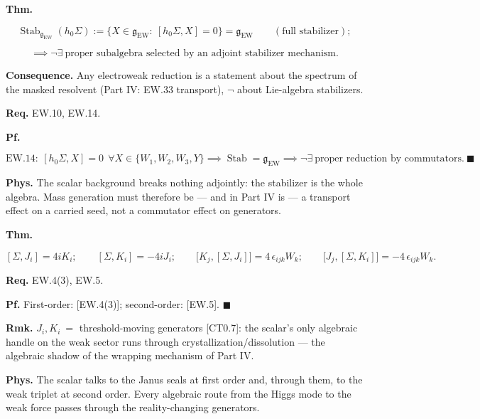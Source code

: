 \begin{theorem}\label{tag:EW-15}
\textbf{Thm.}

\[
\operatorname{Stab}_{\mathfrak g_{\mathrm{EW}}}(h_0\Sigma):=\{X\in\mathfrak g_{\mathrm{EW}}:\ [h_0\Sigma,X]=0\}=\mathfrak g_{\mathrm{EW}}\qquad(\text{full stabilizer});
\]

\[
\implies\neg\exists\ \text{proper subalgebra selected by an adjoint stabilizer mechanism}.
\]

\textbf{Consequence.} Any electroweak reduction is a statement about the spectrum of the masked resolvent (Part IV: EW.33 transport), $\neg$ about Lie-algebra stabilizers.

\textbf{Req.} EW.10, EW.14.

\textbf{Pf.}

\[
\mathrm{EW.14}:\ [h_0\Sigma,X]=0\ \ \forall X\in\{W_1,W_2,W_3,Y\}\implies\operatorname{Stab}=\mathfrak g_{\mathrm{EW}}\implies\neg\exists\ \text{proper reduction by commutators}.\ \blacksquare
\]

\textbf{Phys.} The scalar background breaks nothing adjointly: the stabilizer is the whole algebra. Mass generation must therefore be — and in Part IV is — a transport effect on a carried seed, not a commutator effect on generators.

\end{theorem}

\begin{theorem}\label{tag:EW-16}
\textbf{Thm.}

\[
[\Sigma,J_i]=4iK_i;\qquad[\Sigma,K_i]=-4iJ_i;\qquad
\bigl[K_j,[\Sigma,J_i]\bigr]=4\,\epsilon_{ijk}W_k;\qquad
\bigl[J_j,[\Sigma,K_i]\bigr]=-4\,\epsilon_{ijk}W_k .
\]

\textbf{Req.} EW.4(3), EW.5.

\textbf{Pf.} First-order: [EW.4(3)]; second-order: [EW.5]. $\blacksquare$

\textbf{Rmk.} $J_i,K_i\ =$ threshold-moving generators [CT0.7]: the scalar’s only algebraic handle on the weak sector runs through crystallization/dissolution — the algebraic shadow of the wrapping mechanism of Part IV.

\textbf{Phys.} The scalar talks to the Janus seals at first order and, through them, to the weak triplet at second order. Every algebraic route from the Higgs mode to the weak force passes through the reality-changing generators.

\end{theorem}

